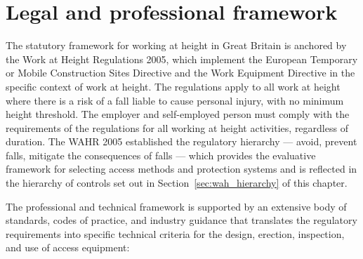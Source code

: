 \section{Legal and professional framework}

The statutory framework for working at height in Great Britain is anchored by the Work at Height Regulations 2005, which implement the European Temporary or Mobile Construction Sites Directive and the Work Equipment Directive in the specific context of work at height. The regulations apply to all work at height where there is a risk of a fall liable to cause personal injury, with no minimum height threshold. The employer and self-employed person must comply with the requirements of the regulations for all working at height activities, regardless of duration. The WAHR 2005 established the regulatory hierarchy --- avoid, prevent falls, mitigate the consequences of falls --- which provides the evaluative framework for selecting access methods and protection systems and is reflected in the hierarchy of controls set out in Section~\ref{sec:wah_hierarchy} of this chapter.

The professional and technical framework is supported by an extensive body of standards, codes of practice, and industry guidance that translates the regulatory requirements into specific technical criteria for the design, erection, inspection, and use of access equipment:

